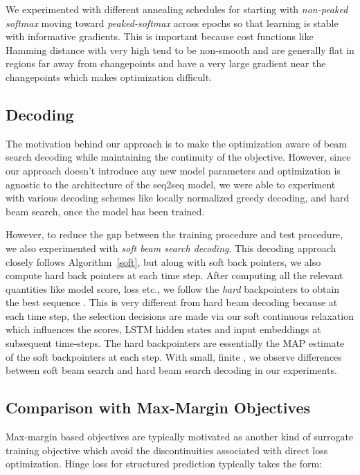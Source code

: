 \documentclass[letterpaper]{article} \usepackage{aaai18}  \usepackage{times}  \usepackage{helvet}  \usepackage{courier}  \usepackage{url}  \usepackage{graphicx}  \frenchspacing
\begin{document}
We experimented with different annealing schedules for  starting with \emph{non-peaked softmax} moving toward \emph{peaked-softmax} across epochs so that learning is stable with informative gradients. This is important because cost functions like Hamming distance with very high  tend to be non-smooth and are generally flat in regions far away from changepoints and have a very large gradient near the changepoints which makes optimization difficult.

\subsection{Decoding \label{decoding}}
The motivation behind our approach is to make the optimization aware of beam search decoding while maintaining the continuity of the objective. However, since our approach doesn't introduce any new model parameters and optimization is agnostic to the architecture of the seq2seq model, we were able to experiment with various decoding schemes like locally normalized greedy decoding, and hard beam search, once the model has been trained.

However, to reduce the gap between the training procedure and test procedure, we also experimented with \emph{soft beam search decoding}. This decoding approach closely follows Algorithm~\ref{soft}, but along with soft back pointers, we also compute hard back pointers at each time step. After computing all the relevant quantities like model score, loss etc., we follow the \emph{hard} backpointers to obtain the best sequence . This is very different from hard beam decoding because at each time step, the selection decisions are made via our soft continuous relaxation which influences the scores, LSTM hidden states and input embeddings at subsequent time-steps. The hard backpointers are essentially the MAP estimate of the soft backpointers at each step. With small, finite , we observe differences between soft beam search and hard beam search decoding in our experiments.

\subsection{Comparison with Max-Margin Objectives \label{maxm}}
Max-margin based objectives are typically motivated as another kind of surrogate training objective which avoid the discontinuities associated with direct loss optimization. Hinge loss for structured prediction typically takes the form:
\end{document}
